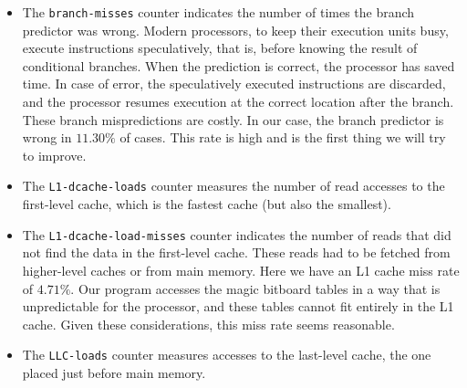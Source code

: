 \documentclass[12pt,a4paper,twoside,openright]{book}
\begin{document}
\begin{itemize}
\item The \texttt{branch-misses} counter indicates the number of times the branch predictor was wrong. Modern processors, to keep their execution units busy, execute instructions speculatively, that is, before knowing the result of conditional branches. When the prediction is correct, the processor has saved time. In case of error, the speculatively executed instructions are discarded, and the processor resumes execution at the correct location after the branch. These branch mispredictions are costly. In our case, the branch predictor is wrong in $11.30\%$ of cases. This rate is high and is the first thing we will try to improve.
\item The \texttt{L1-dcache-loads} counter measures the number of read accesses to the first-level cache, which is the fastest cache (but also the smallest).
\item The \texttt{L1-dcache-load-misses} counter indicates the number of reads that did not find the data in the first-level cache. These reads had to be fetched from higher-level caches or from main memory. Here we have an L1 cache miss rate of $4.71\%$. Our program accesses the magic bitboard tables in a way that is unpredictable for the processor, and these tables cannot fit entirely in the L1 cache. Given these considerations, this miss rate seems reasonable.
\item The \texttt{LLC-loads} counter measures accesses to the last-level cache, the one placed just before main memory.

\end{itemize}
\end{document}

